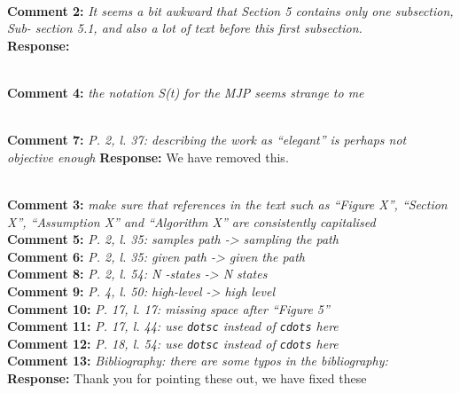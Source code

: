 \documentclass[11pt]{article}
\newcommand{\rev}[2]{\textbf{Comment #1: }\emph{#2}}
\newcommand{\resp}{\textbf{Response: }}
\begin{document}
~\\ 
\rev{2}{It seems a bit awkward that Section 5 contains only one subsection, Sub- section 5.1, and also a lot of text before this first subsection.}\\ 
\resp 

~\\ 
\rev{4}{the notation S(t) for the MJP seems strange to me}

~\\
\rev{7}{P. 2, l. 37: describing the work as “elegant” is perhaps not objective enough}
\resp{We have removed this.}

~\\
\rev{3}{make sure that references in the text such as “Figure X”, “Section X”, “Assumption X” and “Algorithm X” are consistently capitalised} \\
\rev{5}{P. 2, l. 35: samples path -> sampling the path} ~\\
\rev{6}{P. 2, l. 35: given path -> given the path} ~\\
\rev{8}{P. 2, l. 54: N -states -> N states}
~\\
\rev{9}{P. 4, l. 50: high-level -> high level}
~\\
\rev{10}{P. 17, l. 17: missing space after “Figure 5”}
~\\
\rev{11}{P. 17, l. 44: use \texttt{dotsc} instead of \texttt{cdots} here}
~\\
\rev{12}{P. 18, l. 54: use \texttt{dotsc} instead of \texttt{cdots} here}
~\\
\rev{13}{Bibliography: there are some typos in the bibliography:}\\ 
\resp{Thank you for pointing these out, we have fixed these}
\end{document}
